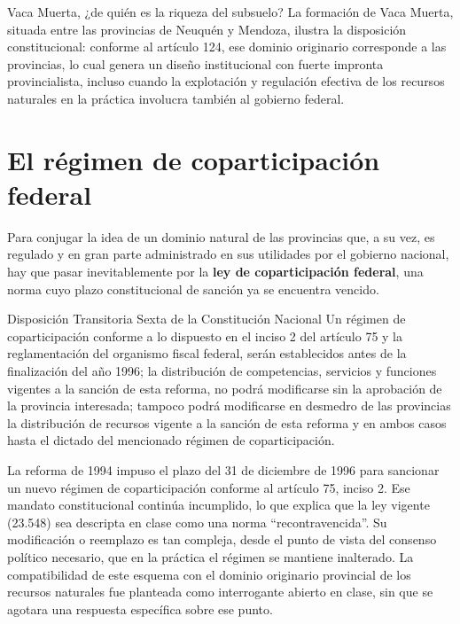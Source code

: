 \documentclass[12pt,oneside]{book}
\begin{document}
\begin{example}{Vaca Muerta, ¿de quién es la riqueza del subsuelo?}
La formación de Vaca Muerta, situada entre las provincias de Neuquén y Mendoza, ilustra la disposición constitucional: conforme al artículo 124, ese dominio originario corresponde a las provincias, lo cual genera un diseño institucional con fuerte impronta provincialista, incluso cuando la explotación y regulación efectiva de los recursos naturales en la práctica involucra también al gobierno federal.
\end{example}

\section{El régimen de coparticipación federal}

Para conjugar la idea de un dominio natural de las provincias que, a su vez, es regulado y en gran parte administrado en sus utilidades por el gobierno nacional, hay que pasar inevitablemente por la \textbf{ley de coparticipación federal}, una norma cuyo plazo constitucional de sanción ya se encuentra vencido.

\begin{norma}{Disposición Transitoria Sexta de la Constitución Nacional}
Un régimen de coparticipación conforme a lo dispuesto en el inciso 2 del artículo 75 y la reglamentación del organismo fiscal federal, serán establecidos antes de la finalización del año 1996; la distribución de competencias, servicios y funciones vigentes a la sanción de esta reforma, no podrá modificarse sin la aprobación de la provincia interesada; tampoco podrá modificarse en desmedro de las provincias la distribución de recursos vigente a la sanción de esta reforma y en ambos casos hasta el dictado del mencionado régimen de coparticipación.
\end{norma}

La reforma de 1994 impuso el plazo del 31 de diciembre de 1996 para sancionar un nuevo régimen de coparticipación conforme al artículo 75, inciso 2. Ese mandato constitucional continúa incumplido, lo que explica que la ley vigente (23.548) sea descripta en clase como una norma ``recontravencida''. Su modificación o reemplazo es tan compleja, desde el punto de vista del consenso político necesario, que en la práctica el régimen se mantiene inalterado. La compatibilidad de este esquema con el dominio originario provincial de los recursos naturales fue planteada como interrogante abierto en clase, sin que se agotara una respuesta específica sobre ese punto.
\end{document}
